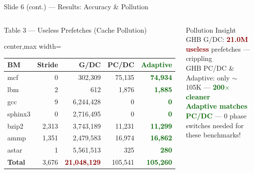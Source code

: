 \documentclass[aspectratio=169,t]{beamer}
\newcommand{\good}[1]{\textcolor{darkgreen}{\textbf{#1}}}
\newcommand{\bad}[1]{\textcolor{darkred}{\textbf{#1}}}
\begin{document}
\begin{frame}{Slide 6 (cont.) --- Results: Accuracy \& Pollution}
\begin{columns}[T]
\begin{block}{Table 3 --- Useless Prefetches (Cache Pollution)}
\tiny
\setlength{\tabcolsep}{2pt}
\centering
\begin{adjustbox}{center,max width=\linewidth}
\begin{tabular}{@{}l r r r r@{}}
\toprule
\textbf{BM} & \textbf{Stride} & \textbf{G/DC} & \textbf{PC/DC} & \textbf{\good{Adaptive}}\\
\midrule
mcf     & 0        & 302,309   & 75,135  & \good{74,934}\\
lbm     & 2        & 612       & 1,876   & \good{1,885}\\
gcc     & 9        & 6,244,428 & 0       & \good{0}\\
sphinx3 & 0        & 2,716,495 & 0       & \good{0}\\
bzip2   & 2,313    & 3,743,189 & 11,231  & \good{11,299}\\
ammp    & 1,351    & 2,479,583 & 16,974  & \good{16,862}\\
astar   & 1        & 5,561,513 & 325     & \good{280}\\
\midrule
\rowcolor{iitblue!10}
\textbf{Total} & 3,676 & \bad{21,048,129} & 105,541 & \good{\textbf{105,260}}\\
\bottomrule
\end{tabular}
\end{adjustbox}
\end{block}
\begin{exampleblock}{\small Pollution Insight}
\tiny
GHB G/DC: \bad{21.0M useless} prefetches --- crippling\\
GHB PC/DC \& Adaptive: only $\sim$105K --- \good{200$\times$ cleaner}\\
\good{Adaptive matches PC/DC} --- 0 phase switches needed for these benchmarks!
\end{exampleblock}
\end{columns}
\end{frame}
\end{document}
